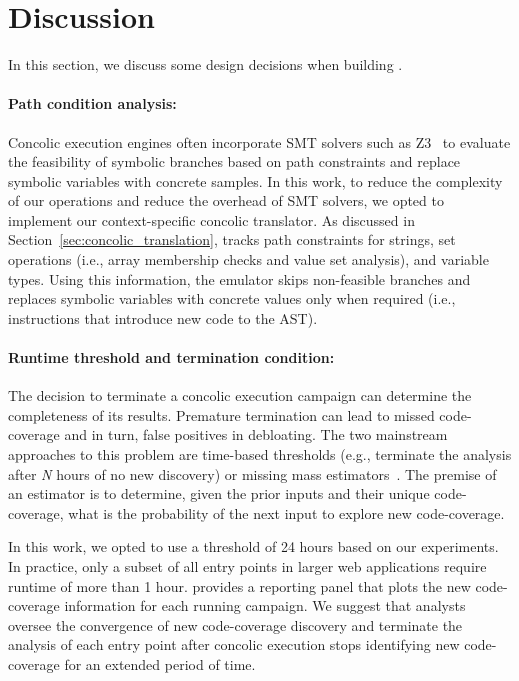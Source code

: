 \section{Discussion}
In this section, we discuss some design decisions when building \animatedead{}. 

\paragraph{Path condition analysis:} 
Concolic execution engines often incorporate SMT solvers such as Z3~\cite{moura2008z3} to evaluate the feasibility of symbolic branches based on path constraints and replace symbolic variables with concrete samples. 
In this work, to reduce the complexity of our operations and reduce the overhead of SMT solvers, we opted to implement our context-specific concolic translator. 
As discussed in Section~\ref{sec:concolic_translation}, \animatedead{} tracks path constraints for strings, set operations (i.e., array membership checks and value set analysis), and variable types. 
Using this information, the emulator skips non-feasible branches and replaces symbolic variables with concrete values only when required (i.e., instructions that introduce new code to the AST). 

\paragraph{Runtime threshold and termination condition:} 
The decision to terminate a concolic execution campaign can determine the completeness of its results. 
Premature termination can lead to missed code-coverage and in turn, false positives in debloating. 
The two mainstream approaches to this problem are time-based thresholds (e.g., terminate the analysis after \emph{N} hours of no new discovery) or missing mass estimators~\cite{goodestimator}. 
The premise of an estimator is to determine, given the prior inputs and their unique code-coverage, what is the probability of the next input to explore new code-coverage. 

In this work, we opted to use a threshold of 24 hours based on our experiments. 
In practice, only a subset of all entry points in larger web applications require runtime of more than 1 hour. 
\animatedead{} provides a reporting panel that plots the new code-coverage information for each running campaign. 
We suggest that analysts oversee the convergence of new code-coverage discovery and terminate the analysis of each entry point after concolic execution stops identifying new code-coverage for an extended period of time. 

